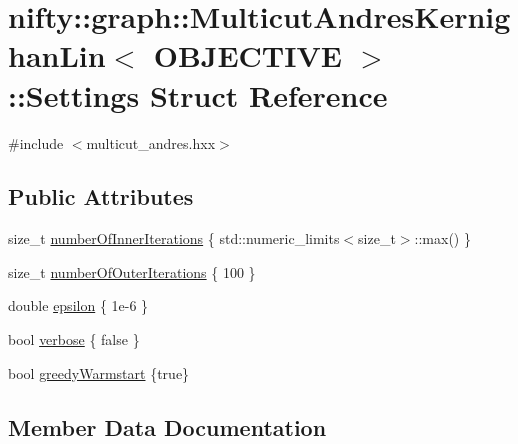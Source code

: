 \hypertarget{structnifty_1_1graph_1_1MulticutAndresKernighanLin_1_1Settings}{}\section{nifty\+:\+:graph\+:\+:Multicut\+Andres\+Kernighan\+Lin$<$ O\+B\+J\+E\+C\+T\+I\+V\+E $>$\+:\+:Settings Struct Reference}
\label{structnifty_1_1graph_1_1MulticutAndresKernighanLin_1_1Settings}


{\ttfamily \#include $<$multicut\+\_\+andres.\+hxx$>$}

\subsection*{Public Attributes}
\begin{DoxyCompactItemize}
\item 
size\+\_\+t \hyperlink{structnifty_1_1graph_1_1MulticutAndresKernighanLin_1_1Settings_af6fb7ffb9df3a12f2b251f28a9df501a}{number\+Of\+Inner\+Iterations} \{ std\+::numeric\+\_\+limits$<$size\+\_\+t$>$\+::max() \}
\item 
size\+\_\+t \hyperlink{structnifty_1_1graph_1_1MulticutAndresKernighanLin_1_1Settings_abdb148ebe4241c5e825c793e175c5666}{number\+Of\+Outer\+Iterations} \{ 100 \}
\item 
double \hyperlink{structnifty_1_1graph_1_1MulticutAndresKernighanLin_1_1Settings_a28c72976c780e40ea36432ee89347d64}{epsilon} \{ 1e-\/6 \}
\item 
bool \hyperlink{structnifty_1_1graph_1_1MulticutAndresKernighanLin_1_1Settings_a73c18aae79e4a0c5eb5038b0675888f0}{verbose} \{ false \}
\item 
bool \hyperlink{structnifty_1_1graph_1_1MulticutAndresKernighanLin_1_1Settings_a66c77858ee84583941e743f7f288c837}{greedy\+Warmstart} \{true\}
\end{DoxyCompactItemize}


\subsection{Member Data Documentation}
\hypertarget{structnifty_1_1graph_1_1MulticutAndresKernighanLin_1_1Settings_a28c72976c780e40ea36432ee89347d64}{}
